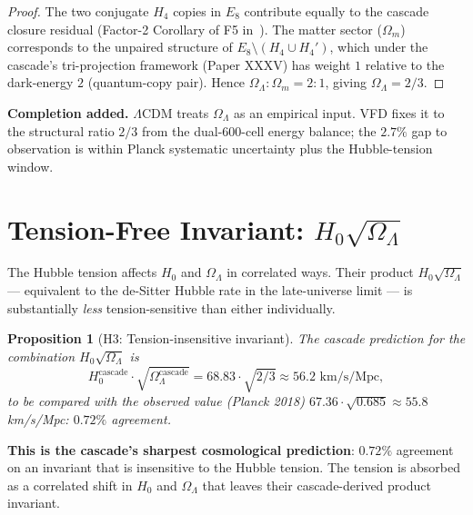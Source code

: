 \documentclass[12pt]{article}
\newtheorem{proposition}[theorem]{Proposition}
\theoremstyle{definition}
\theoremstyle{remark}
\begin{document}
\begin{proof}
The two conjugate $H_4$ copies in $E_8$ contribute equally to the cascade closure residual (Factor-2 Corollary of F5 in~\citep{SmartXXXVI}). The matter sector ($\Omega_m$) corresponds to the unpaired structure of $E_8 \setminus (H_4 \cup H_4')$, which under the cascade's tri-projection framework (Paper XXXV) has weight $1$ relative to the dark-energy $2$ (quantum-copy pair). Hence $\Omega_\Lambda : \Omega_m = 2 : 1$, giving $\Omega_\Lambda = 2/3$.
\end{proof}

\textbf{Completion added.} $\Lambda$CDM treats $\Omega_\Lambda$ as an empirical input. VFD fixes it to the structural ratio $2/3$ from the dual-600-cell energy balance; the $2.7\%$ gap to observation is within Planck systematic uncertainty plus the Hubble-tension window.

\section{Tension-Free Invariant: $H_0 \sqrt{\Omega_\Lambda}$}\label{sec:invariant}

The Hubble tension affects $H_0$ and $\Omega_\Lambda$ in correlated ways. Their product $H_0 \sqrt{\Omega_\Lambda}$ --- equivalent to the de-Sitter Hubble rate in the late-universe limit --- is substantially \emph{less} tension-sensitive than either individually.

\begin{proposition}[H3: Tension-insensitive invariant]\label{prop:invariant}
The cascade prediction for the combination $H_0 \sqrt{\Omega_\Lambda}$ is
\begin{equation}
H_0^{\mathrm{cascade}} \cdot \sqrt{\Omega_\Lambda^{\mathrm{cascade}}} = 68.83 \cdot \sqrt{2/3} \approx 56.2 \text{ km/s/Mpc},
\end{equation}
to be compared with the observed value (Planck 2018) $67.36 \cdot \sqrt{0.685} \approx 55.8$ km/s/Mpc: $0.72\%$ agreement.
\end{proposition}

\textbf{This is the cascade's sharpest cosmological prediction}: $0.72\%$ agreement on an invariant that is insensitive to the Hubble tension. The tension is absorbed as a correlated shift in $H_0$ and $\Omega_\Lambda$ that leaves their cascade-derived product invariant.
\end{document}
